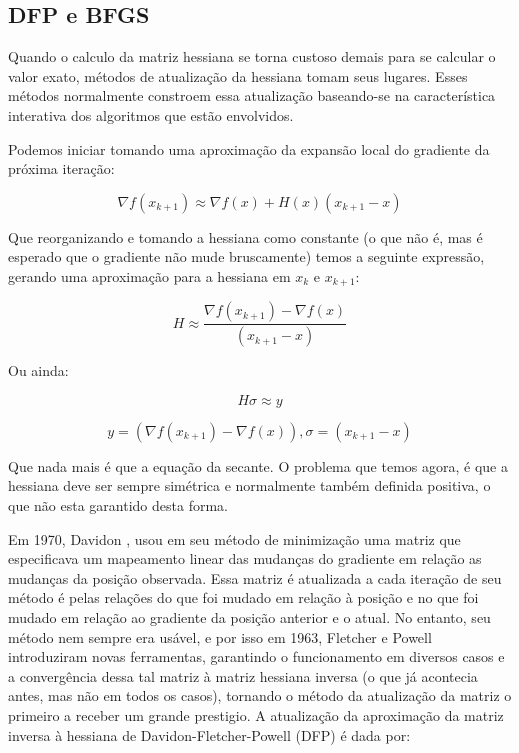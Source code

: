 \subsection{DFP e BFGS}
Quando o calculo da matriz hessiana se torna custoso demais para se calcular o valor exato,
métodos de atualização da hessiana tomam seus lugares. Esses métodos normalmente constroem
essa atualização baseando-se na característica interativa dos algoritmos que estão envolvidos.

Podemos iniciar tomando uma aproximação da expansão local do gradiente da próxima iteração:

\begin{equation*}
\nabla f(x_{k+1}) \approx \nabla f(x) + H(x) (x_{k+1} - x)
\end{equation*}

Que reorganizando e tomando a hessiana como constante (o que não é, mas é esperado que o gradiente
não mude bruscamente) temos a seguinte expressão, gerando uma aproximação para a hessiana em \(x_k\)
e \(x_{k+1}\):

\begin{equation*}
H \approx \frac{\nabla f(x_{k+1}) - \nabla f(x)}{(x_{k+1} - x)}
\end{equation*}

Ou ainda:

\begin{equation*}
H\sigma \approx y
\end{equation*}

\begin{equation*}
y = (\nabla f(x_{k+1}) - \nabla f(x)), \sigma = (x_{k+1} - x)
\end{equation*}


Que nada mais é que a equação da secante. O problema que temos agora, é que a hessiana deve ser
sempre simétrica e normalmente também definida positiva, o que não esta garantido desta forma.

Em 1970, Davidon \cite{davidon1991variable}, usou em seu método de minimização uma matriz que
especificava um mapeamento linear das mudanças do gradiente em relação as mudanças da posição
observada. Essa matriz é atualizada a cada iteração de seu método é pelas relações do que foi
mudado em relação à posição e no que foi mudado em relação ao gradiente da posição anterior
e o atual. No entanto, seu método nem sempre era usável, e por isso em 1963, Fletcher e Powell
\cite{fletcher1963rapidly} introduziram novas ferramentas, garantindo o funcionamento em diversos
casos e a convergência dessa tal matriz à matriz hessiana inversa (o que já acontecia antes, mas
não em todos os casos), tornando o método da atualização da matriz o primeiro a receber um grande
prestigio. A atualização da aproximação da matriz inversa à hessiana de Davidon-Fletcher-Powell
(DFP) é dada por:

